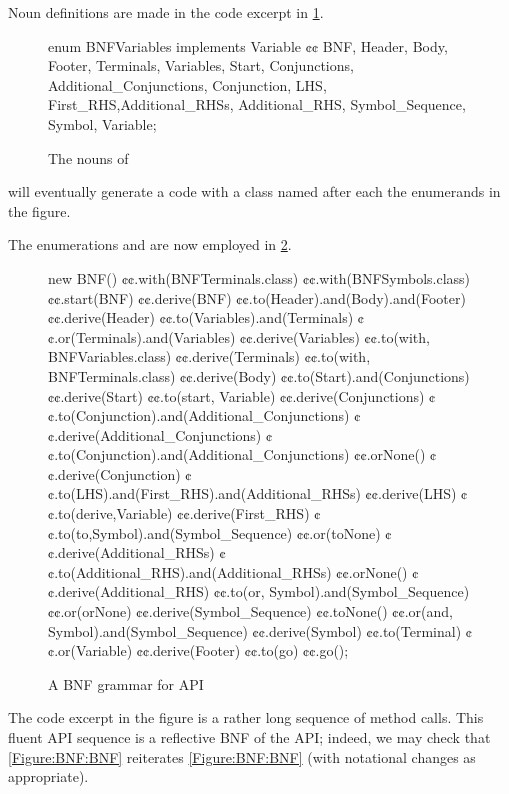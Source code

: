 Noun definitions are made in the code excerpt in \cref{Figure:Nouns}.

\begin{figure}[h]
  \begin{JAVA}[style=code]
enum BNFVariables implements Variable {¢¢
  BNF, Header, Body, Footer,
  Terminals, Variables, Start,
  Conjunctions, Additional_Conjunctions,
  Conjunction, LHS, First_RHS,Additional_RHSs,
  Additional_RHS, Symbol_Sequence,
  Symbol, Variable;
}\end{JAVA}
  \caption{The nouns of \Self}
  \label{Figure:Nouns}
\end{figure}
  \Self will eventually generate a code with
  a class named after each the enumerands in the figure.

The
enumerations  and
  are now employed in \cref{Figure:BNF:fluent}.

\begin{figure}[h]
  \begin{JAVA}[style=numbered]
new BNF()
  ¢¢.with(BNFTerminals.class)
  ¢¢.with(BNFSymbols.class)
  ¢¢.start(BNF)
  ¢¢.derive(BNF)
    ¢¢.to(Header).and(Body).and(Footer)
  ¢¢.derive(Header)
    ¢¢.to(Variables).and(Terminals)
    ¢¢.or(Terminals).and(Variables)
  ¢¢.derive(Variables)
    ¢¢.to(with, BNFVariables.class)
  ¢¢.derive(Terminals)
    ¢¢.to(with, BNFTerminals.class)
  ¢¢.derive(Body)
    ¢¢.to(Start).and(Conjunctions)
  ¢¢.derive(Start)
    ¢¢.to(start, Variable)
  ¢¢.derive(Conjunctions)
    ¢¢.to(Conjunction).and(Additional_Conjunctions)
  ¢¢.derive(Additional_Conjunctions)
    ¢¢.to(Conjunction).and(Additional_Conjunctions)
    ¢¢.orNone()
  ¢¢.derive(Conjunction)
    ¢¢.to(LHS).and(First_RHS).and(Additional_RHSs)
  ¢¢.derive(LHS)
    ¢¢.to(derive,Variable)
  ¢¢.derive(First_RHS)
    ¢¢.to(to,Symbol).and(Symbol_Sequence)
    ¢¢.or(toNone)
  ¢¢.derive(Additional_RHSs)
    ¢¢.to(Additional_RHS).and(Additional_RHSs)
    ¢¢.orNone()
  ¢¢.derive(Additional_RHS)
    ¢¢.to(or, Symbol).and(Symbol_Sequence)
    ¢¢.or(orNone)
  ¢¢.derive(Symbol_Sequence)
    ¢¢.toNone()
    ¢¢.or(and, Symbol).and(Symbol_Sequence)
  ¢¢.derive(Symbol)
    ¢¢.to(Terminal)
    ¢¢.or(Variable)
  ¢¢.derive(Footer)
    ¢¢.to(go)
¢¢.go();
\end{JAVA}
  \caption{A BNF grammar for \Self API}
  \label{Figure:BNF:fluent}
\end{figure}

The code excerpt in the figure is a rather long
  sequence of method calls.
This fluent API sequence is a reflective BNF
  of the \Self API;
  indeed, we may check that \cref{Figure:BNF:BNF} reiterates \cref{Figure:BNF:BNF}
  (with notational changes as appropriate).

